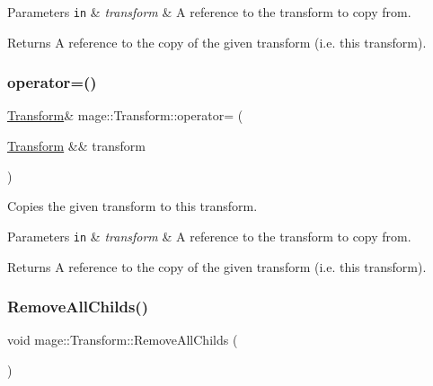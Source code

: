 \begin{DoxyParams}[1]{Parameters}
\mbox{\tt in}  & {\em transform} & A reference to the transform to copy from. \\
\hline
\end{DoxyParams}
\begin{DoxyReturn}{Returns}
A reference to the copy of the given transform (i.\+e. this transform). 
\end{DoxyReturn}
\hypertarget{structmage_1_1_transform_a73f47760665264da8af254fa937b3560}{}\label{structmage_1_1_transform_a73f47760665264da8af254fa937b3560} 
\subsubsection{\texorpdfstring{operator=()}{operator=()}\hspace{0.1cm}{\footnotesize\ttfamily [2/2]}}
{\footnotesize\ttfamily \hyperlink{structmage_1_1_transform}{Transform}\& mage\+::\+Transform\+::operator= (\begin{DoxyParamCaption}\item[{\hyperlink{structmage_1_1_transform}{Transform} \&\&}]{transform }\end{DoxyParamCaption})\hspace{0.3cm}{\ttfamily [default]}}

Copies the given transform to this transform.


\begin{DoxyParams}[1]{Parameters}
\mbox{\tt in}  & {\em transform} & A reference to the transform to copy from. \\
\hline
\end{DoxyParams}
\begin{DoxyReturn}{Returns}
A reference to the copy of the given transform (i.\+e. this transform). 
\end{DoxyReturn}
\hypertarget{structmage_1_1_transform_a1f9e00affb4b41338a6a946867a1d5a4}{}\label{structmage_1_1_transform_a1f9e00affb4b41338a6a946867a1d5a4} 
\subsubsection{\texorpdfstring{Remove\+All\+Childs()}{RemoveAllChilds()}}
{\footnotesize\ttfamily void mage\+::\+Transform\+::\+Remove\+All\+Childs (\begin{DoxyParamCaption}{ }\end{DoxyParamCaption})}

